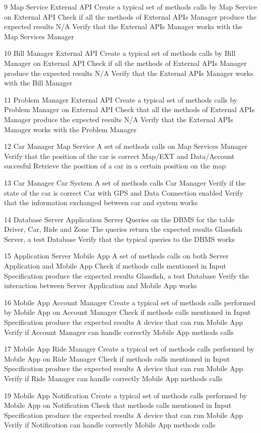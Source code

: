 \testCase
	{9}
	{Map Service}
	{External API}
	{Create a typical set of methods calls by Map Service on External API}
	{Check if all the methods of External  APIs Manager produce the expected results}
	{N/A}
	{Verify that the External APIs Manager works  with the Map Services Manager}
	
\testCase
	{10}
	{Bill Manager}
	{External API}
	{Create a typical set of methods calls by Bill Manager on External API}
	{Check if all the methods of External   APIs Manager produce the expected results}
	{N/A}
	{Verify that the External APIs Manager works  with the Bill Manager}

\testCase
	{11}
	{Problem Manager}
	{External API}
	{Create a typical set of methods calls by Problem Manager on External API}
	{Check that all the methods of External   APIs Manager produce the expected results}
	{N/A}
	{Verify that the External APIs Manager works  with the Problem Manager}

\testCase
	{12}
	{Car Manager}
	{Map Service}
	{A set of methods calls on Map Services Manager}
	{Verify that the position of the car is correct}
	{Map/EXT and Data/Account succesful}
	{Retrieve the position of a car in a certain position on the map}

\testCase
	{13}
	{Car Manager}
	{Car System}
	{A set of methods calls Car Manager}
	{Verify if the state of the car is correct}
	{Car with GPS and Data Connection enabled}
	{Verify that the information exchanged between car and system works}

\testCase
	{14}
	{Database Server}
	{Application Server}
	{Queries on the DBMS for the table Driver, Car, Ride and Zone}
	{The queries return the expected results}
	{Glassfish Server, a test Database}
	{Verify that the typical queries to the DBMS  works}

\testCase
	{15}
	{Application Server}
	{Mobile App}
	{A set of methods calls on both Server Application and Mobile App }
	{Check if methods calls mentioned in Input Specification produce the expected results}
	{Glassfish, a test Database}
	{Verify the interaction between Server Application and Mobile App works}

\testCase
	{16}
	{Mobile App}
	{Account Manager}
	{Create a typical set of methods calls performed by Mobile App on Account Manager}
	{Check if methods calls mentioned in Input Specification produce the expected results}
	{A device that can run Mobile App}
	{Verify  if Account Manager can handle correctly Mobile App methods calls}
	
\testCase
	{17}
	{Mobile App}
	{Ride Manager}
	{Create a typical set of methods calls performed by Mobile App on Ride Manager}
	{Check if methods calls mentioned in Input Specification produce the expected results}
	{A device that can run Mobile App}
	{Verify  if Ride Manager can handle correctly Mobile App methods calls}

\testCase
	{19}
	{Mobile App}
	{Notification}
	{Create a typical set of methods calls performed by Mobile App on Notification}
	{Check that methods calls mentioned in Input Specification produce the expected results}
	{A device that can run Mobile App}
	{Verify  if Notification can handle correctly Mobile App methods calls}